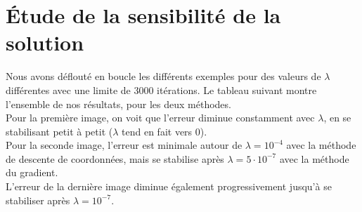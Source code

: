 \documentclass[12pt, a4paper]{report}
\begin{document}

\section{Étude de la sensibilité de la solution}
Nous avons déflouté en boucle les différents exemples pour des valeurs de $\lambda$ différentes avec une limite de 3000 itérations. Le tableau suivant montre l'ensemble de nos résultats, pour les deux méthodes. \\

Pour la première image, on voit que l'erreur diminue constamment avec $\lambda$, en se stabilisant petit à petit ($\lambda$ tend en fait vers 0). \\
Pour la seconde image, l'erreur est minimale autour de $\lambda = 10^{-4}$ avec la méthode de descente de coordonnées, mais se stabilise après $\lambda = 5\cdot10^{-7}$ avec la méthode du gradient. \\
L'erreur de la dernière image diminue également progressivement jusqu'à se stabiliser après $\lambda = 10^{-7}$.
\end{document}
